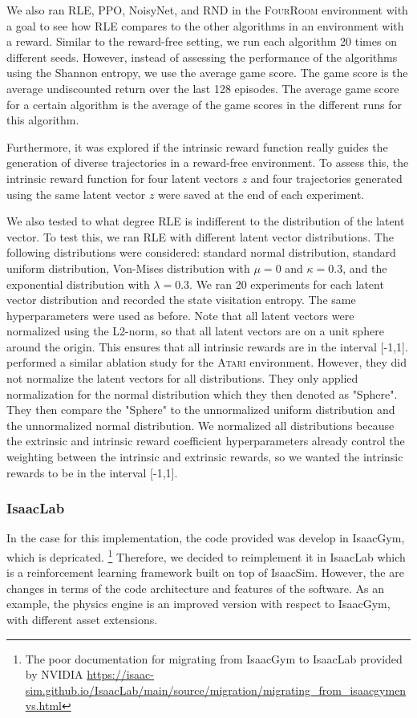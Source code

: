 \documentclass[10pt]{article} %
\begin{document}
We also ran RLE, PPO, NoisyNet, and RND in the \textsc{FourRoom} environment with a goal to see how RLE compares to the other algorithms in an environment with a reward. Similar to the reward-free setting, we run each algorithm 20 times on different seeds. However, instead of assessing the performance of the algorithms using the Shannon entropy, we use the average game score. The game score is the average undiscounted return over the last 128 episodes. The average game score for a certain algorithm is the average of the game scores in the different runs for this algorithm.

Furthermore, it was explored if the intrinsic reward function really guides the generation of diverse trajectories in a reward-free environment. To assess this, the intrinsic reward function for four latent vectors $z$ and four trajectories generated using the same latent vector $z$ were saved at the end of each experiment. 

We also tested to what degree RLE is indifferent to the distribution of the latent vector. To test this, we ran RLE with different latent vector distributions. The following distributions were considered: standard normal distribution, standard uniform distribution, Von-Mises distribution with $\mu=0$ and $\kappa=0.3$, and the exponential distribution with $\lambda=0.3$. We ran 20 experiments for each latent vector distribution and recorded the state visitation entropy. The same hyperparameters were used as before. Note that all latent vectors were normalized using the L2-norm, so that all latent vectors are on a unit sphere around the origin. This ensures that all intrinsic rewards are in the interval [-1,1]. \cite{rle-paper} performed a similar ablation study for the \textsc{Atari} environment. However, they did not normalize the latent vectors for all distributions. They only applied normalization for the normal distribution which they then denoted as "Sphere". They then compare the "Sphere" to the unnormalized uniform distribution and the unnormalized normal distribution. We normalized all distributions because the extrinsic and intrinsic reward coefficient hyperparameters already control the weighting between the intrinsic and extrinsic rewards, so we wanted the intrinsic rewards to be in the interval [-1,1].


\subsubsection{IsaacLab}
In the case for this implementation, the code provided was develop in IsaacGym, which is depricated. \footnote{The poor documentation for migrating from IsaacGym to IsaacLab provided by NVIDIA \url{https://isaac-sim.github.io/IsaacLab/main/source/migration/migrating_from_isaacgymenvs.html}} Therefore, we decided to reimplement it in IsaacLab which is a 
reinforcement learning framework built on top of IsaacSim. However, the are changes in terms of the code architecture and features of the software. As an example, 
the physics engine is an improved version with respect to IsaacGym, with different asset extensions.
\end{document}
